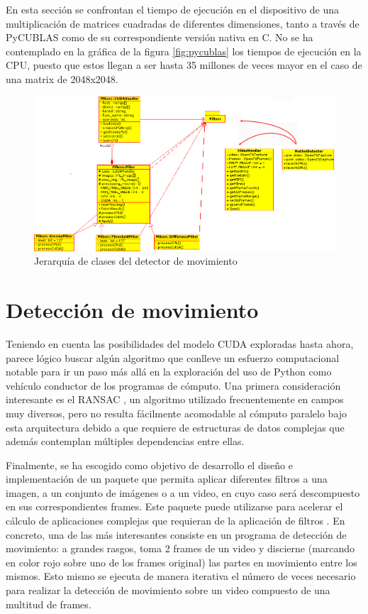 \documentclass[twocolumn,twoside]{Jornadas}
\begin{document}

En esta sección se confrontan el tiempo de ejecución en el dispositivo de una multiplicación de matrices cuadradas de diferentes dimensiones, tanto a través de PyCUBLAS como de su correspondiente versión nativa en C. No se ha contemplado en la gráfica de la figura \ref{fig:pycublas} los tiempos de ejecución en la CPU, puesto que estos llegan a ser hasta 35 millones de veces mayor en el caso de una matrix de 2048x2048.


\begin{figure}[t]
   \begin{center}
      \includegraphics[width=.9\textwidth]{UML.png}
      \caption{\label{fig:UML}Jerarquía de clases del detector de movimiento}
   \end{center}
\end{figure}
\section{Detección de movimiento}

Teniendo en cuenta las posibilidades del modelo CUDA exploradas hasta ahora, parece lógico buscar algún algoritmo que conlleve un esfuerzo computacional notable para ir un paso más allá en la exploración del uso de Python como vehículo conductor de los programas de cómputo. Una primera consideración interesante es el RANSAC \cite{Jiayin:2010:CMD:1933304.1933936}, un algoritmo utilizado frecuentemente en campos muy diversos, pero no resulta fácilmente acomodable al cómputo paralelo bajo esta arquitectura debido a que requiere de estructuras de datos complejas que además contemplan múltiples dependencias entre ellas.



Finalmente, se ha escogido como objetivo de desarrollo el diseño e implementación de un paquete que permita aplicar diferentes filtros a una imagen, a un conjunto de imágenes o a un video, en cuyo caso será descompuesto en sus correspondientes frames. Este paquete puede utilizarse para acelerar el cálculo de aplicaciones complejas que requieran de la aplicación de filtros \cite{DBLP:conf/csse/YangZP08}. En concreto, una de las más interesantes consiste en un programa de detección de movimiento: a grandes rasgos, toma 2 frames de un video y discierne (marcando en color rojo sobre uno de los frames original) las partes en movimiento entre los mismos. Esto mismo se ejecuta de manera iterativa el número de veces necesario para realizar la detección de movimiento sobre un video compuesto de una multitud de frames.
\end{document}
